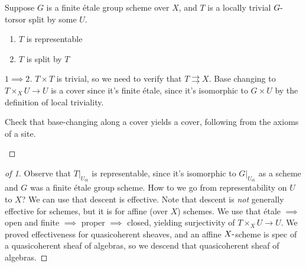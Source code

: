 \begin{example}[?]

Suppose \(G\) is a finite étale group scheme over \(X\), and \(T\) is a
locally trivial \(G{\hbox{-}}\)torsor split by some \(U\).

\begin{claim}

\envlist

\begin{enumerate}
\def\labelenumi{\arabic{enumi}.}
\item
  \(T\) is representable
\item
  \(T\) is split by \(T\)
\end{enumerate}

\end{claim}

\begin{proof}[$1\implies 2$]

\(T\times T\) is trivial, so we need to verify that
\(T \rightrightarrows X\). Base changing to \(T\times_X U \to U\) is a
cover since it's finite étale, since it's isomorphic to \(G\times U\) by
the definition of local triviality.

\begin{exercise}[?]

Check that base-changing along a cover yields a cover, following from
the axioms of a site.

\end{exercise}

\end{proof}

\begin{proof}[of 1]

Observe that \({ \left.{{T}} \right|_{{U_\text{ét}}} }\) is
representable, since it's isomorphic to
\({ \left.{{G}} \right|_{{U_\text{ét}}} }\) as a scheme and \(G\) was a
finite étale group scheme. How to we go from representability on \(U\)
to \(X\)? We can use that descent is effective. Note that descent is
\emph{not} generally effective for schemes, but it is for affine (over
\(X\)) schemes. We use that étale \(\implies\) open and finite
\(\implies\) proper \(\implies\) closed, yielding surjectivity of
\(T\times_X U \to U\). We proved effectiveness for quasicoherent
sheaves, and an affine \(X{\hbox{-}}\)scheme is spec of a quasicoherent
sheaf of algebras, so we descend that quasicoherent sheaf of algebras.

\end{proof}

\end{example}

